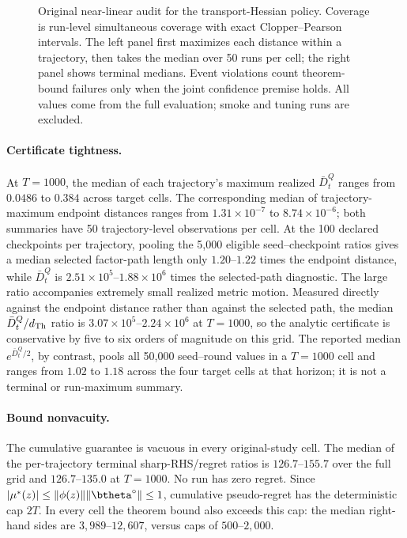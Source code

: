 \begin{figure}[p]
  \centering
  
  \caption{Original near-linear audit for the transport-Hessian policy.
  Coverage is run-level simultaneous coverage with exact Clopper--Pearson
  intervals.  The left panel first maximizes each distance within a
  trajectory, then takes the median over 50 runs per cell; the right panel
  shows terminal medians.  Event violations count theorem-bound failures only
  when the joint confidence premise holds.  All
  values come from the full evaluation; smoke and tuning runs are excluded.}
  \label{fig:transport-instantiation-validity}
\end{figure}

\paragraph{Certificate tightness.}
At $T=1000$, the median of each trajectory's maximum realized $\bar D_t^Q$
ranges from $0.0486$ to $0.384$ across target cells.  The corresponding median
of trajectory-maximum endpoint distances ranges from $1.31\times10^{-7}$ to
$8.74\times10^{-6}$; both summaries have 50 trajectory-level observations per
cell.  At the 100 declared checkpoints per trajectory, pooling the 5,000
eligible seed--checkpoint ratios gives a median selected factor-path length only
$1.20$--$1.22$ times the endpoint distance, while $\bar D_t^Q$ is
$2.51\times10^5$--$1.88\times10^6$ times the selected-path diagnostic.  The
large ratio accompanies extremely small realized metric motion.  Measured
directly against the endpoint distance rather than against the selected path,
the median $\bar D_t^Q/d_{\rm Th}$ ratio is $3.07\times10^5$--$2.24\times10^6$
at $T=1000$, so the analytic certificate is conservative by five to six orders
of magnitude on this grid.  The reported
median $e^{\bar D_t^Q/2}$, by contrast, pools all 50,000 seed--round values in a
$T=1000$ cell and ranges from $1.02$ to $1.18$ across the four target cells at
that horizon; it is not a terminal or run-maximum summary.

\paragraph{Bound nonvacuity.}
The cumulative guarantee is vacuous in every original-study cell.  The median of the
per-trajectory terminal sharp-RHS/regret ratios is $126.7$--$155.7$ over the
full grid and $126.7$--$135.0$ at $T=1000$.  No run has zero regret.
Since $|\mu^*(z)|\le\|\phi(z)\|\|\btheta^\circ\|\le1$, cumulative
pseudo-regret has the deterministic cap $2T$.  In every cell the theorem bound
also exceeds this cap: the median right-hand sides are
$3{,}989$--$12{,}607$, versus caps of $500$--$2{,}000$.

